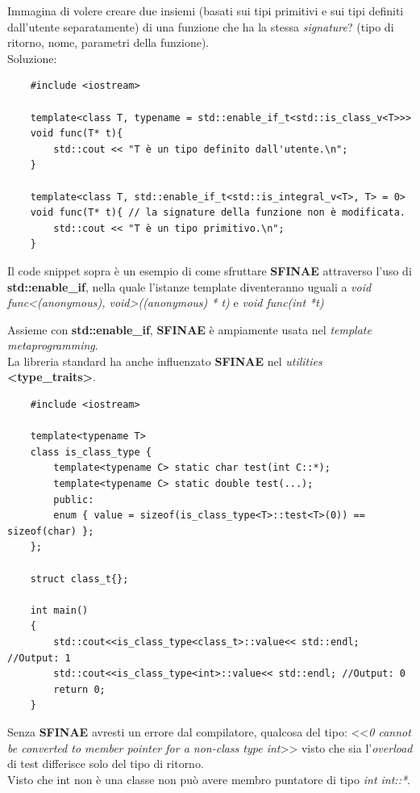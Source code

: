 \textsf{\small Immagina di volere creare due insiemi (basati sui tipi primitivi e sui tipi definiti dall'utente separatamente) di una funzione che ha la stessa \emph{signature}? (tipo di ritorno, nome, parametri della funzione).} \\

\textsf{\small Soluzione: } \\

\begin{lstlisting}
	#include <iostream>
	
	template<class T, typename = std::enable_if_t<std::is_class_v<T>>>
	void func(T* t){
		std::cout << "T è un tipo definito dall'utente.\n";
	}
	
	template<class T, std::enable_if_t<std::is_integral_v<T>, T> = 0>
	void func(T* t){ // la signature della funzione non è modificata.
		std::cout << "T è un tipo primitivo.\n";
	}
\end{lstlisting}

\textsf{\small Il code snippet sopra è un esempio di come sfruttare \textbf{SFINAE} attraverso l'uso di \textbf{std::enable\_if}, nella quale l'istanze template diventeranno uguali a \emph{void func<(anonymous), void>((anonymous) * t)} e \emph{void func(int *t)}} \break

\textsf{\small Assieme con \textbf{std::enable\_if}, \textbf{SFINAE} è ampiamente usata nel \emph{template metaprogramming}.} \\

\textsf{\small La libreria standard ha anche influenzato \textbf{SFINAE} nel \emph{utilities} \textbf{<type\_traits>}.} \\

\begin{lstlisting}
	#include <iostream>
	
	template<typename T>
	class is_class_type {
		template<typename C> static char test(int C::*);    
		template<typename C> static double test(...);
		public:
		enum { value = sizeof(is_class_type<T>::test<T>(0)) == sizeof(char) };
	};
	
	struct class_t{};
	
	int main()
	{
		std::cout<<is_class_type<class_t>::value<< std::endl; //Output: 1
		std::cout<<is_class_type<int>::value<< std::endl; //Output: 0
		return 0;
	}
\end{lstlisting}

\textsf{\small Senza \textbf{SFINAE} avresti un errore dal compilatore, qualcosa del tipo: <<\emph{0 cannot be converted to member pointer for a non-class type int}>> visto che sia l'\emph{overload} di test differisce solo del tipo di ritorno.} \\
\textsf{\small Visto che int non è una classe non può avere membro puntatore di tipo \emph{int int::*}.} \\

